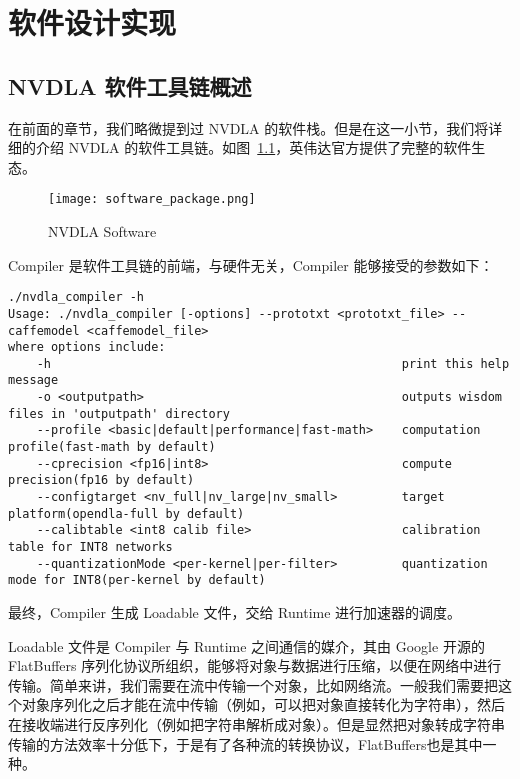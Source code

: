 \chapter{软件设计实现}\label{chap:software}

\section{NVDLA 软件工具链概述}

在前面的章节，我们略微提到过 NVDLA 的软件栈。但是在这一小节，我们将详细的介绍 NVDLA 的软件工具链。如图~\ref{fig:NVDLA Software}，英伟达官方提供了完整的软件生态。

\begin{figure}[!htbp]
    \centering
    \texttt{[image: software\_package.png]}
    \caption{NVDLA Software}
    \label{fig:NVDLA Software}
\end{figure}

Compiler 是软件工具链的前端，与硬件无关，Compiler 能够接受的参数如下：

\lstset{language=Bash}
\begin{lstlisting}
./nvdla_compiler -h
Usage: ./nvdla_compiler [-options] --prototxt <prototxt_file> --caffemodel <caffemodel_file>
where options include:
    -h                                                 print this help message
    -o <outputpath>                                    outputs wisdom files in 'outputpath' directory
    --profile <basic|default|performance|fast-math>    computation profile(fast-math by default)
    --cprecision <fp16|int8>                           compute precision(fp16 by default)
    --configtarget <nv_full|nv_large|nv_small>         target platform(opendla-full by default)
    --calibtable <int8 calib file>                     calibration table for INT8 networks
    --quantizationMode <per-kernel|per-filter>         quantization mode for INT8(per-kernel by default)

\end{lstlisting}

最终，Compiler 生成 Loadable 文件，交给 Runtime 进行加速器的调度。

Loadable 文件是 Compiler 与 Runtime 之间通信的媒介，其由 Google 开源的 FlatBuffers 序列化协议所组织，能够将对象与数据进行压缩，以便在网络中进行传输。简单来讲，我们需要在流中传输一个对象，比如网络流。一般我们需要把这个对象序列化之后才能在流中传输（例如，可以把对象直接转化为字符串），然后在接收端进行反序列化（例如把字符串解析成对象）。但是显然把对象转成字符串传输的方法效率十分低下，于是有了各种流的转换协议，FlatBuffers也是其中一种。

